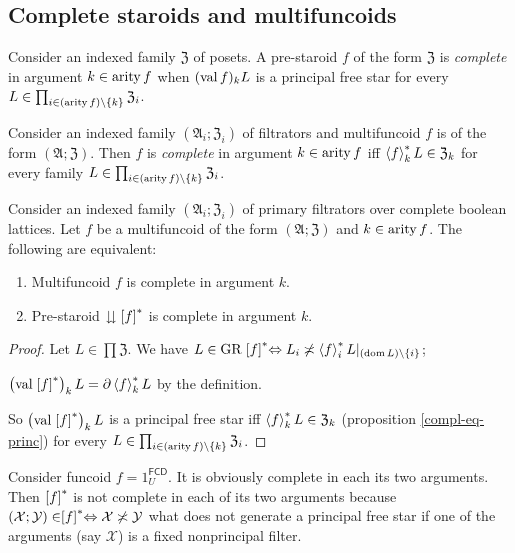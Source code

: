 \subsection{Complete staroids and multifuncoids}
\begin{defn}
Consider an indexed family $\mathfrak{Z}$
of posets. A pre-staroid $f$ of the form $\mathfrak{Z}$ is \emph{complete}
in argument $k\in\operatorname{arity} f$ when $(\operatorname{val} f)_{k}L$ is a principal free
star for every $L\in\prod_{i\in(\operatorname{arity} f)\setminus\{k\}}\mathfrak{Z}_{i}$.
\end{defn}

\begin{defn}
Consider an indexed family $(\mathfrak{A}_{i};\mathfrak{Z}_{i})$
of filtrators and multifuncoid $f$ is of the form $(\mathfrak{A};\mathfrak{Z})$.
Then $f$ is \emph{complete} in argument $k\in\operatorname{arity} f$ iff $\left\langle f\right\rangle ^{\ast}_{k}L\in\mathfrak{Z}_{k}$
for every family $L\in\prod_{i\in(\operatorname{arity} f)\setminus\{k\}}\mathfrak{Z}_{i}$.\end{defn}
\begin{prop}
Consider an indexed family $(\mathfrak{A}_{i};\mathfrak{Z}_{i})$
of primary filtrators over complete boolean lattices. Let $f$ be a multifuncoid
of the form $(\mathfrak{A};\mathfrak{Z})$ and $k\in\operatorname{arity} f$. The following are
equivalent:
\begin{enumerate}
\item Multifuncoid $f$ is complete in argument $k$.
\item Pre-staroid $\downdownarrows\mathord{\mathrel{\left[f\right]^{\ast}}}$ is complete in argument
$k$.
\end{enumerate}
\end{prop}
\begin{proof}
Let $L\in\prod\mathfrak{Z}$. We have $L\in\operatorname{GR}\mathrel{\left[f\right]^{\ast}}\Leftrightarrow L_{i}\not\asymp\left\langle f\right\rangle ^{\ast}_{i}L|_{(\operatorname{dom} L)\setminus\{i\}}$;

$\left(\operatorname{val}\mathrel{\left[f\right]^{\ast}}\right)_{k}L=\partial\left\langle f\right\rangle ^{\ast}_{k}L$ by the
definition.

So $\left(\operatorname{val}\mathrel{\left[f\right]^{\ast}}\right)_{k}L$ is a principal free star iff
$\left\langle f\right\rangle ^{\ast}_{k}L\in\mathfrak{Z}_{k}$ (proposition \ref{compl-eq-princ})
for every $L\in\prod_{i\in(\operatorname{arity} f)\setminus\{k\}}\mathfrak{Z}_{i}$.\end{proof}
\begin{example}
Consider funcoid $f=1_{U}^{\mathsf{FCD}}$. It is obviously complete
in each its two arguments. Then $\mathrel{\left[f\right]^{\ast}}$ is not complete in each
of its two arguments because $(\mathcal{X};\mathcal{Y})\in\mathrel{\left[f\right]^{\ast}}\Leftrightarrow\mathcal{X}\not\asymp\mathcal{Y}$
what does not generate a principal free star if one of the arguments
(say $\mathcal{X}$) is a fixed nonprincipal filter.\end{example}
